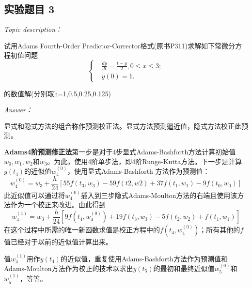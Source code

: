 \documentclass[12pt]{ctexart}
\begin{document}
	\subsection{实验题目 3}
	\textit{Topic description：}
	
	试用Adams Fourth-Order Predictor-Corrector格式(原书P311)求解如下常微分方程初值问题
	\begin{equation*}
	\left\{
	\begin{aligned}
	&\frac{dy}{dt}=\frac{t-y}{2},0\leq x\leq 3; \\
	&y(0)=1.
	\end{aligned}
	\right.
	\end{equation*}
	
	的数值解(分别取h=1,0.5,0.25,0.125)
	
	\textit{Answer：}
	
	显式和隐式方法的组合称作预测校正法。显式方法预测逼近值，隐式方法校正此预测。
	
	\textbf{Adams4阶预测修正法}第一步是对于4步显式Adams-Bashforth方法计算初始值$w_0,w_1,w_2$和$w_3$。为此，使用4阶单步法，即4阶Runge-Kutta方法。下一步是计算$y(t_4)$的近似值$w_4^{(0)}$，使用显式Adams-Bashforth 方法作为预测值：$$w_4^{(0)}=w_3+\frac{h}{24}[55f(t_3,w_3)-59f(t2,w2)+37f(t_1,w_1)-9f(t_0,w_0)]$$此近似值可以通过将$w_4^{(0)}$插入到三步隐式Adams-Moulton方法的右端且使用该方法作为一个校正来改进。由此得到$$w_4^{(1)}=w_3+\frac{h}{24}[9f(t_4,w_4^{(0)})+19f(t_3,w_3)-5f(t_2,w_2)+f(t_1,w_1)]$$在这个过程中所需的唯一新函数求值是校正方程中的$f(t_4,w_4^{(0)})$；所有其他的$f$值已经对于以前的近似值计算出来。
	
	值$w_4^{(1)}$用作$y(t_4)$的近似值，重复使用Adams-Bashforth方法作为预测值和Adams-Moulton方法作为校正的技术以求出$y(t_5)$的最初和最终近似值$w_5^{(0)}$和$w_5^{(1)}$，等等。
	
\end{document}
